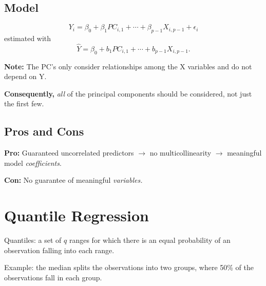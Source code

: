 \documentclass[12pt]{../notes}
\begin{document}
\subsection{Model}
$$Y_i = \beta_0 + \beta_1PC_{i, 1} + \cdots + \beta_{p-1}X_{i, p-1} + \epsilon_i$$
estimated with 
$$\hat{Y}= \beta_0 + b_1PC_{i, 1} + \cdots + b_{p-1}X_{i, p-1}.$$

\textbf{Note:} The PC's only consider relationships among the X variables and do not depend on Y. 

\nspace
\textbf{Consequently,} \textit{all} of the principal components should be considered, not just the first few. 


\begin{minipage}[l][2cm][c]{\textwidth}
\end{minipage}

\subsection{Pros and Cons}
\bi
\item \textbf{Pro:} Guaranteed uncorrelated predictors $\rightarrow$ no multicollinearity $\rightarrow$ meaningful model \textit{coefficients}. 
\item \textbf{Con:} No guarantee of meaningful \textit{variables.}
\ei

\section{Quantile Regression}
Quantiles: a set of $q$ ranges for which there is an equal probability of an observation falling into each range. 
\bi
\item Example: the median splits the observations into two groups, where 50\% of the observations fall in each group. 
\ei
\end{document}
